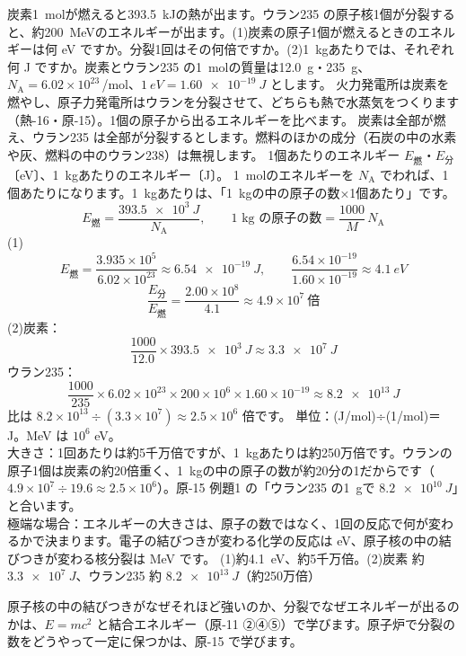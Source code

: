 \begin{phreidai}\label{ph:原-0:ex2}
炭素\qty{1}{mol}が燃えると\qty{393.5}{kJ}の熱が出ます。ウラン235 の原子核1個が分裂すると、約\qty{200}{MeV}のエネルギーが出ます。(1)\enspace 炭素の原子1個が燃えるときのエネルギーは何 eV ですか。分裂1回はその何倍ですか。(2)\enspace \qty{1}{kg}あたりでは、それぞれ何 J ですか。炭素とウラン235 の\qty{1}{mol}の質量は\qty{12.0}{g}・\qty{235}{g}、$N_{\mathrm A}=6.02\times10^{23}$\,/mol、$\qty{1}{eV}=\qty{1.60e-19}{J}$ とします。
\phbamen
火力発電所は炭素を燃やし、原子力発電所はウランを分裂させて、どちらも熱で水蒸気をつくります（熱-16・原-15）。1個の原子から出るエネルギーを比べます。
\phmushi
炭素は全部が燃え、ウラン235 は全部が分裂するとします。燃料のほかの成分（石炭の中の水素や灰、燃料の中のウラン238）は無視します。
\phzu
1個あたりのエネルギー $E_{\text{燃}}$・$E_{\text{分}}$〔eV〕、\qty{1}{kg}あたりのエネルギー〔J〕。
\phriyu
\qty{1}{mol}のエネルギーを $N_{\mathrm A}$ でわれば、1個あたりになります。\qty{1}{kg}あたりは、「\qty{1}{kg}の中の原子の数×1個あたり」です。
\phtateru
\[E_{\text{燃}}=\frac{\qty{393.5e3}{J}}{N_{\mathrm A}},\qquad \text{1 kg の原子の数}=\frac{1000}{M}\,N_{\mathrm A}\]
\phtoku
(1)
\[E_{\text{燃}}=\frac{3.935\times10^5}{6.02\times10^{23}}\approx\qty{6.54e-19}{J},\qquad \frac{6.54\times10^{-19}}{1.60\times10^{-19}}\approx\qty{4.1}{eV}\]
\[\frac{E_{\text{分}}}{E_{\text{燃}}}=\frac{2.00\times10^8}{4.1}\approx4.9\times10^7\ \text{倍}\]
(2)\enspace 炭素：
\[\frac{1000}{12.0}\times\qty{393.5e3}{J}\approx\qty{3.3e7}{J}\]
ウラン235：
\[\frac{1000}{235}\times6.02\times10^{23}\times200\times10^6\times1.60\times10^{-19}\approx\qty{8.2e13}{J}\]
比は $8.2\times10^{13}\div(3.3\times10^7)\approx2.5\times10^6$ 倍です。
\phtashikame
単位：(J/mol)÷(1/mol)＝J。MeV は $10^6$ eV。\\
大きさ：1回あたりは約5千万倍ですが、\qty{1}{kg}あたりは約250万倍です。ウランの原子1個は炭素の約20倍重く、\qty{1}{kg}の中の原子の数が約20分の1だからです（$4.9\times10^7\div19.6\approx2.5\times10^6$）。原-15 例題1 の「ウラン235 の\qty{1}{g}で $\qty{8.2e10}{J}$」と合います。\\
極端な場合：エネルギーの大きさは、原子の数ではなく、1回の反応で何が変わるかで決まります。電子の結びつきが変わる化学の反応は eV、原子核の中の結びつきが変わる核分裂は MeV です。
\kotae (1)\enspace 約\qty{4.1}{eV}、約5千万倍。(2)\enspace 炭素 約 $\qty{3.3e7}{J}$、ウラン235 約 $\qty{8.2e13}{J}$（約250万倍）
\end{phreidai}
\noindent 原子核の中の結びつきがなぜそれほど強いのか、分裂でなぜエネルギーが出るのかは、$E=mc^2$ と結合エネルギー（原-11 ②④⑤）で学びます。原子炉で分裂の数をどうやって一定に保つかは、原-15 で学びます。

